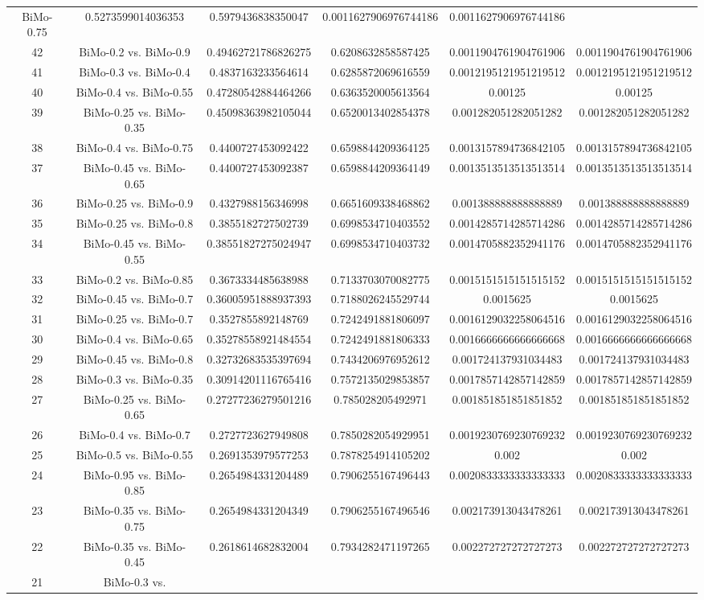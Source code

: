 \documentclass[a4paper,10pt]{article}
\begin{document}
\begin{landscape}
\begin{table}[!htp]
\begin{tabular}{cccccc}
BiMo-0.75&0.5273599014036353&0.5979436838350047&0.0011627906976744186&0.0011627906976744186\\42&BiMo-0.2 vs. BiMo-0.9&0.49462721786826275&0.6208632858587425&0.0011904761904761906&0.0011904761904761906\\41&BiMo-0.3 vs. BiMo-0.4&0.4837163233564614&0.6285872069616559&0.0012195121951219512&0.0012195121951219512\\40&BiMo-0.4 vs. BiMo-0.55&0.47280542884464266&0.6363520005613564&0.00125&0.00125\\39&BiMo-0.25 vs. BiMo-0.35&0.45098363982105044&0.6520013402854378&0.001282051282051282&0.001282051282051282\\38&BiMo-0.4 vs. BiMo-0.75&0.4400727453092422&0.6598844209364125&0.0013157894736842105&0.0013157894736842105\\37&BiMo-0.45 vs. BiMo-0.65&0.4400727453092387&0.6598844209364149&0.0013513513513513514&0.0013513513513513514\\36&BiMo-0.25 vs. BiMo-0.9&0.4327988156346998&0.6651609338468862&0.001388888888888889&0.001388888888888889\\35&BiMo-0.25 vs. BiMo-0.8&0.3855182727502739&0.6998534710403552&0.0014285714285714286&0.0014285714285714286\\34&BiMo-0.45 vs. BiMo-0.55&0.38551827275024947&0.6998534710403732&0.0014705882352941176&0.0014705882352941176\\33&BiMo-0.2 vs. BiMo-0.85&0.3673334485638988&0.7133703070082775&0.0015151515151515152&0.0015151515151515152\\32&BiMo-0.45 vs. BiMo-0.7&0.36005951888937393&0.7188026245529744&0.0015625&0.0015625\\31&BiMo-0.25 vs. BiMo-0.7&0.3527855892148769&0.7242491881806097&0.0016129032258064516&0.0016129032258064516\\30&BiMo-0.4 vs. BiMo-0.65&0.35278558921484554&0.7242491881806333&0.0016666666666666668&0.0016666666666666668\\29&BiMo-0.45 vs. BiMo-0.8&0.32732683535397694&0.7434206976952612&0.001724137931034483&0.001724137931034483\\28&BiMo-0.3 vs. BiMo-0.35&0.30914201116765416&0.7572135029853857&0.0017857142857142859&0.0017857142857142859\\27&BiMo-0.25 vs. BiMo-0.65&0.27277236279501216&0.785028205492971&0.001851851851851852&0.001851851851851852\\26&BiMo-0.4 vs. BiMo-0.7&0.2727723627949808&0.7850282054929951&0.0019230769230769232&0.0019230769230769232\\25&BiMo-0.5 vs. BiMo-0.55&0.2691353979577253&0.7878254914105202&0.002&0.002\\24&BiMo-0.95 vs. BiMo-0.85&0.2654984331204489&0.7906255167496443&0.0020833333333333333&0.0020833333333333333\\23&BiMo-0.35 vs. BiMo-0.75&0.2654984331204349&0.7906255167496546&0.002173913043478261&0.002173913043478261\\22&BiMo-0.35 vs. BiMo-0.45&0.2618614682832004&0.7934282471197265&0.002272727272727273&0.002272727272727273\\21&BiMo-0.3 vs. 
\end{tabular}
\end{table}
\end{landscape}
\end{document}
